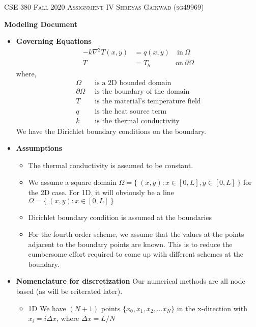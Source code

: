 \documentclass[12 pt, final]{article}
\begin{document}

\noindent\textsc{
CSE 380 Fall 2020
\hfill
Assignment IV
\hfill
Shreyas Gaikwad (sg49969)}

\begin{center}
\Large{\textbf{Modeling Document}}
\end{center}

\begin{itemize}
    \item \textbf{Governing Equations}
        \begin{align}
            -k\nabla^2 T(x,y) &= q(x,y) &\:\text{in}\: \Omega \label{eq1}\\
            T&= T_b &\text{on}\: \partial\Omega \nonumber 
        \end{align}
        where,
        \begin{align*}
            \Omega &\:\text{ is a 2D bounded domain}\\
            \partial\Omega &\:\text{ is the boundary of the domain}\\
            T &\:\text{ is the material's temperature field}\\
            q &\:\text{ is the heat source term}\\
            k &\:\text{ is the thermal conductivity}
        \end{align*}
        We have the Dirichlet boundary conditions on the boundary. 
        
    \item \textbf{Assumptions}
        \begin{itemize}
            \item The thermal conductivity is assumed to be constant.
            \item We assume a square domain $\Omega = \{\:(x,y) : x \in [0,L], y \in [0,L]\:\}$ for the 2D case. For 1D, it will obviously be a line $\Omega = \{\:(x,y) : x \in [0,L]\:\}$
            \item Dirichlet boundary condition is assumed at the boundaries
            \item For the fourth order scheme, we assume that the values at the points adjacent to the boundary points are known. This is to reduce the cumbersome effort required to come up with different schemes at the boundary.
        \end{itemize}
    \item \textbf{Nomenclature for discretization}
    Our numerical methods are all node based (as will be reiterated later).
        \begin{itemize}
            \item 1D We have $(N+1)$ points $\{x_0,x_1,x_2,\hdots x_N\}$ in the x-direction with $x_i=i\Delta x$, where $\Delta x = L/N$
                

\end{itemize}
\end{itemize}
\end{document}
